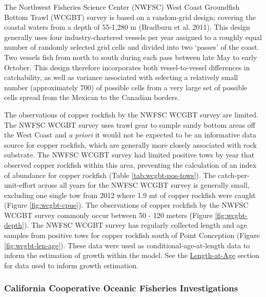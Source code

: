 \documentclass[11pt,
  english,
  letterpaper,
]{article}
\begin{document}
The Northwest Fisheries Science Center (NWFSC) West Coast Groundfish Bottom Trawl (WCGBT) survey is based on a random-grid design; covering the coastal waters from a depth of 55-1,280 m (Bradburn et al. 2011). This design generally uses four industry-chartered vessels per year assigned to a roughly equal number of randomly selected grid cells and divided into two `passes' of the coast. Two vessels fish from north to south during each pass between late May to early October. This design therefore incorporates both vessel-to-vessel differences in catchability, as well as variance associated with selecting a relatively small number (approximately 700) of possible cells from a very large set of possible cells spread from the Mexican to the Canadian borders.

The observations of copper rockfish by the NWFSC WCGBT survey are limited. The NWFSC WCGBT survey uses trawl gear to sample sandy bottom areas off the West Coast and \emph{a priori} it would not be expected to be an informative data source for copper rockfish, which are generally more closely associated with rock substrate. The NWFSC WCGBT survey had limited positive tows by year that observed copper rockfish within this area, preventing the calculation of an index of abundance for copper rockfish (Table \ref{tab:wcgbt-pos-tows}). The catch-per-unit-effort across all years for the NWFSC WCGBT survey is generally small, excluding one single tow from 2012 where 1.9 mt of copper rockfish were caught (Figure \ref{fig:wcgbt-cpue}). The observations of copper rockfish by the NWFSC WCGBT survey commonly occur between 50 - 120 meters (Figure \ref{fig:wcgbt-depth}). The NWFSC WCGBT survey has regularly collected length and age samples from positive tows for copper rockfish south of Point Conception (Figure \ref{fig:wcgbt-len-age}). These data were used as conditional-age-at-length data to inform the estimation of growth within the model. See the \protect\hyperlink{length-at-age}{Length-at-Age} section for data used to inform growth estimation.

\hypertarget{california-cooperative-oceanic-fisheries-investigations}{%
\subsubsection{California Cooperative Oceanic Fisheries Investigations}\label{california-cooperative-oceanic-fisheries-investigations}}
\end{document}
